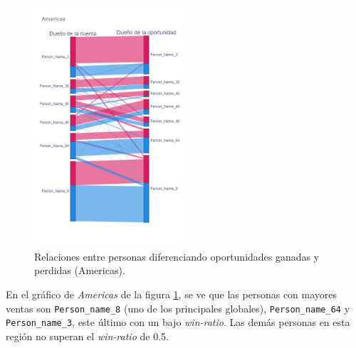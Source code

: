 \documentclass[titlepage,a4paper]{article}
\begin{document}
\begin{figure}[H]
\centering
\includegraphics[width=0.5\textwidth]{images/ps_personas_america.png}
\cprotect\caption{\label{fig:ps_personas_america} Relaciones entre personas diferenciando oportunidades ganadas y perdidas (Americas).}
\end{figure}


En el gráfico de \textit{Americas} de la figura \ref{fig:ps_personas_america}, se ve que las personas con mayores ventas son \verb|Person_name_8| (uno de los principales globales), \verb|Person_name_64| y \verb|Person_name_3|, este último con un bajo \textit{win-ratio}. Las demás personas en esta región no superan el \textit{win-ratio} de 0.5.
\end{document}
